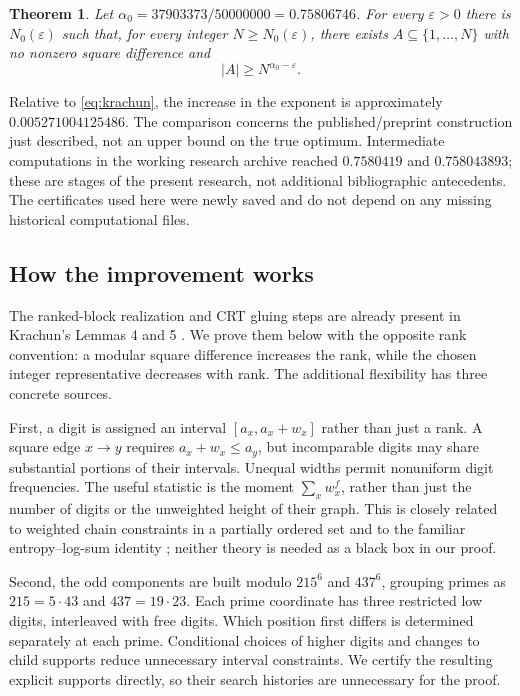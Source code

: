 \documentclass[11pt]{article}
\newtheorem{theorem}{Theorem}[section]
\theoremstyle{definition}
\theoremstyle{remark}
\newcommand{\al}{\alpha_0}
\newcommand{\card}[1]{\lvert #1\rvert}
\begin{document}
\begin{theorem}\label{thm:main}
Let $\al=37903373/50000000=0.75806746$. For every $\varepsilon>0$ there is
$N_0(\varepsilon)$ such that, for every integer $N\ge N_0(\varepsilon)$,
there exists $A\subseteq\{1,\ldots,N\}$ with no nonzero square difference and
\[
 \card A\ge N^{\al-\varepsilon}.
\]
\end{theorem}

Relative to \eqref{eq:krachun}, the increase in the exponent is approximately
$0.005271004125486$. The comparison concerns the published/preprint
construction just described, not an upper bound on the true optimum.
Intermediate computations in the working research archive reached
$0.7580419$ and $0.758043893$; these are stages of the present research,
not additional bibliographic antecedents. The certificates used here were
newly saved and do not depend on any missing historical computational files.

\subsection{How the improvement works}
The ranked-block realization and CRT gluing steps are already present in
Krachun's Lemmas 4 and 5 \cite{Krachun2026}. We prove them below with the
opposite rank convention: a modular square difference increases the rank,
while the chosen integer representative decreases with rank.
The additional flexibility has three concrete sources.

First, a digit is assigned an interval $[a_x,a_x+w_x]$ rather than just a
rank. A square edge $x\to y$ requires $a_x+w_x\le a_y$, but incomparable
digits may share substantial portions of their intervals. Unequal widths
permit nonuniform digit frequencies. The useful statistic is the moment
$\sum_xw_x^f$, rather than just the number of digits or the unweighted
height of their graph. This is closely related to weighted chain constraints
in a partially ordered set \cite{Stanley1986} and to the familiar
entropy--log-sum identity \cite{CoverThomas2006}; neither theory is needed
as a black box in our proof.

Second, the odd components are built modulo $215^6$ and $437^6$, grouping
primes as $215=5\cdot43$ and $437=19\cdot23$. Each prime coordinate has
three restricted low digits, interleaved with free digits. Which position
first differs is determined separately at each prime. Conditional choices
of higher digits and changes to child supports reduce unnecessary interval
constraints. We certify the resulting explicit supports directly, so their
search histories are unnecessary for the proof.
\end{document}
